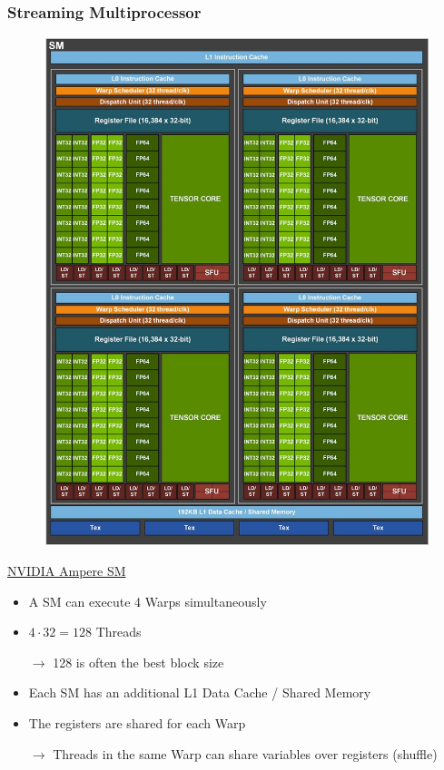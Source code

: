 \documentclass[aspectratio=169,handout]{beamer}
\begin{document}
\frame
{
	\frametitle{Streaming Multiprocessor}
	\begin{minipage}{0.3\linewidth}
	\begin{figure}
		\includegraphics[height=0.8\textheight]{ampere_sm}
	\end{figure}
	\centering
	\href{https://developer.nvidia.com/blog/nvidia-ampere-architecture-in-depth/}{NVIDIA Ampere SM}
	\end{minipage}
	\begin{minipage}{0.68\linewidth}
\begin{itemize}
	\item A SM can execute 4 Warps simultaneously
	\item $4 \cdot 32 = 128$ Threads
	\item[$\rightarrow$] 128 is often the best block size
	\item Each SM has an additional L1 Data Cache / Shared Memory
	\item The registers are shared for each Warp
	\item[$\rightarrow$] Threads in the same Warp can share variables over registers (shuffle)
\end{itemize}
	\end{minipage}
	

	
}
\end{document}
